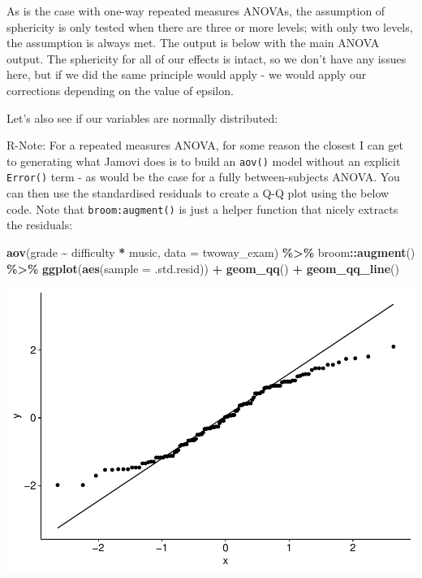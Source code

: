 \documentclass[
]{book}
\newenvironment{Shaded}{\begin{snugshade}}{\end{snugshade}}
\newcommand{\AttributeTok}[1]{\textcolor[rgb]{0.13,0.29,0.53}{#1}}
\newcommand{\FunctionTok}[1]{\textcolor[rgb]{0.13,0.29,0.53}{\textbf{#1}}}
\newcommand{\NormalTok}[1]{#1}
\newcommand{\SpecialCharTok}[1]{\textcolor[rgb]{0.81,0.36,0.00}{\textbf{#1}}}
\begin{document}
As is the case with one-way repeated measures ANOVAs, the assumption of sphericity is only tested when there are three or more levels; with only two levels, the assumption is always met. The output is below with the main ANOVA output. The sphericity for all of our effects is intact, so we don't have any issues here, but if we did the same principle would apply - we would apply our corrections depending on the value of epsilon.

Let's also see if our variables are normally distributed:

R-Note: For a repeated measures ANOVA, for some reason the closest I can get to generating what Jamovi does is to build an \texttt{aov()} model without an explicit \texttt{Error()} term - as would be the case for a fully between-subjects ANOVA. You can then use the standardised residuals to create a Q-Q plot using the below code. Note that \texttt{broom:augment()} is just a helper function that nicely extracts the residuals:

\begin{Shaded}
\begin{Highlighting}[]
\FunctionTok{aov}\NormalTok{(grade }\SpecialCharTok{\textasciitilde{}}\NormalTok{ difficulty }\SpecialCharTok{*}\NormalTok{ music, }\AttributeTok{data =}\NormalTok{ twoway\_exam) }\SpecialCharTok{\%\textgreater{}\%}
\NormalTok{  broom}\SpecialCharTok{::}\FunctionTok{augment}\NormalTok{() }\SpecialCharTok{\%\textgreater{}\%}
  \FunctionTok{ggplot}\NormalTok{(}\FunctionTok{aes}\NormalTok{(}\AttributeTok{sample =}\NormalTok{ .std.resid)) }\SpecialCharTok{+}
  \FunctionTok{geom\_qq}\NormalTok{() }\SpecialCharTok{+}
  \FunctionTok{geom\_qq\_line}\NormalTok{()}
\end{Highlighting}
\end{Shaded}

\includegraphics{_main_files/figure-latex/unnamed-chunk-254-1.pdf}
\end{document}
